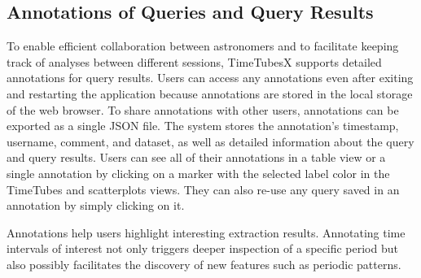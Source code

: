\subsection{Annotations of Queries and Query Results}
%
To enable efficient collaboration between astronomers and to facilitate keeping track of analyses between different sessions, TimeTubesX supports detailed annotations for query results.
%
Users can access any annotations even after exiting and restarting the application because annotations are stored in the local storage of the web browser. 
To share annotations with other users, annotations can be exported as a single JSON file. 
The system stores the annotation's timestamp, username, comment, and dataset, as well as detailed information about the query and query results.
Users can see all of their annotations in a table view or a single annotation by clicking on a marker with the selected label color in the TimeTubes and scatterplots views.
They can also re-use any query saved in an annotation by simply clicking on it. %

Annotations help users highlight interesting extraction results.
%
%
Annotating time intervals of interest not only triggers deeper inspection of a specific period 
but also possibly facilitates the discovery of new features such as periodic patterns.







